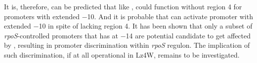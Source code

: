 It is, therefore, can be predicted that like \siga{}, \sigs{}
could function without region 4 for promoters with extended $-$10.
And it is probable that \lzsig{} can activate promoter with
extended $-$10 in spite of lacking region 4. It has been shown
that only a subset of \emph{rpoS}-controlled promoters that has
 at $-$14 are potential candidate to get affected by
\lzsig{}, resulting in promoter discrimination within \emph{rpoS}
regulon. The implication of such discrimination, if at all
operational in Lz4W, remains to be investigated.
